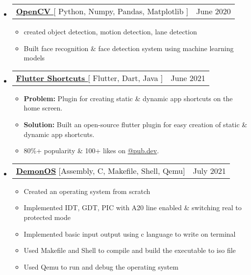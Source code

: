 \documentclass[letterpaper,11pt]{article}
\makeatletter
\newcommand{\resumeItem}[1]{
  \item\small{
    {#1 \vspace{-2pt}}
  }
}
\newcommand{\resumeProjectHeading}[2]{
    \item
    \begin{tabular*}{0.97\textwidth}{l@{\extracolsep{\fill}}r}
      \small#1 & #2 \\
    \end{tabular*}\vspace{-7pt}
}
\newcommand{\resumeSubHeadingListStart}{\begin{itemize}[leftmargin=0.15in, label={}]}
\newcommand{\resumeSubHeadingListEnd}{\end{itemize}}
\newcommand{\resumeItemListStart}{\begin{itemize}}
\newcommand{\resumeItemListEnd}{\end{itemize}\vspace{-5pt}}
\makeatother
\begin{document}
    \resumeSubHeadingListStart
      \resumeProjectHeading
          {\textbf{\href{https://github.com/divshekhar/OpenCV}{OpenCV }}{[ Python, Numpy, Pandas, Matplotlib ]}}{June 2020}
          \resumeItemListStart
           \resumeItem{created object detection, motion detection, lane detection}
           \resumeItem{Built face recognition \& face detection system using machine learning models}
          \resumeItemListEnd
    \resumeSubHeadingListEnd

    \resumeSubHeadingListStart
      \resumeProjectHeading
          {\textbf{\href{https://pub.dev/packages/flutter_shortcuts}{Flutter Shortcuts }}{[ Flutter, Dart, Java ]}}{June 2021}
          \resumeItemListStart
           \resumeItem{\textbf{Problem:} Plugin for creating static \& dynamic app shortcuts on the home screen.}
           \resumeItem{\textbf{Solution:} Built an open-source flutter plugin for easy creation of static \& dynamic app shortcuts.}
           \resumeItem{80\%+ popularity \& 100+ likes on  \href{https://pub.dev/packages/flutter_shortcuts}{@pub.dev}.}
          \resumeItemListEnd
    \resumeSubHeadingListEnd
    
  \resumeSubHeadingListStart
      \resumeProjectHeading
          {\textbf{\href{https://github.com/divshekhar/DemonOS}{\textbf{DemonOS}}}{ [Assembly, C, Makefile, Shell, Qemu]}}{July 2021}
          \resumeItemListStart
            \resumeItem{Created an operating system from scratch}
            \resumeItem{Implemented IDT, GDT, PIC with A20 line enabled \& switching real to protected mode}
            \resumeItem{Implemented basic input output using c language to write on terminal}
            \resumeItem{Used Makefile and Shell to compile and build the executable to iso file}
            \resumeItem{Used Qemu to run and debug the operating system}
          \resumeItemListEnd
    \resumeSubHeadingListEnd
    
\end{document}
